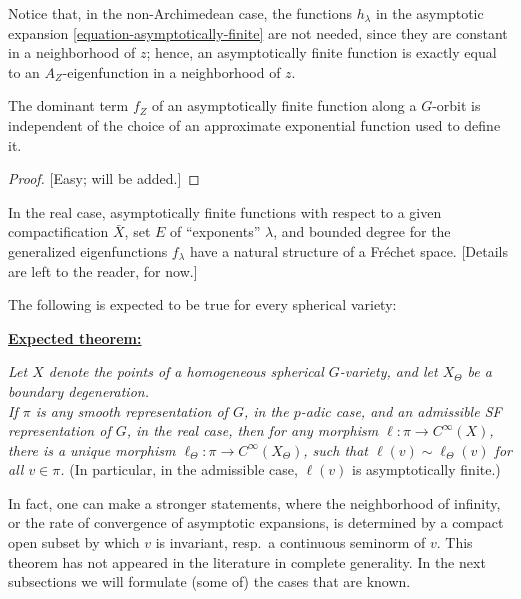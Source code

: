 \begin{remark}
 \label{remark-asymptotically-finite-padic}
Notice that, in the non-Archimedean case, the functions $h_\lambda$ in the asymptotic expansion \eqref{equation-asymptotically-finite} are not needed, since they are constant in a neighborhood of $z$; hence, an asymptotically finite function is exactly equal to an $A_Z$-eigenfunction in a neighborhood of $z$.
\end{remark}



\begin{lemma}
 \label{lemma-dominant-term}
The dominant term $f_Z$ of an asymptotically finite function along a $G$-orbit is independent of the choice of an approximate exponential function used to define it.
\end{lemma}

\begin{proof}

[Easy; will be added.]
\end{proof}

In the real case, asymptotically finite functions with respect to a given compactification $\bar X$, set $E$ of ``exponents'' $\lambda$, and bounded degree for the generalized eigenfunctions $f_\lambda$ have a natural structure of a Fr\'echet space. [Details are left to the reader, for now.]



\begin{remark}
\label{remark-expectedtheorem-asymptotics} 
The following is expected to be true for every spherical variety:

\underline{\textbf{Expected theorem:}}

\emph{
Let $X$ denote the points of a homogeneous spherical $G$-variety, and let $X_\Theta$ be a boundary degeneration.\\
  If $\pi$ is any smooth representation of $G$, in the $p$-adic case, and an admissible SF representation of $G$, in the real case, then for any morphism $\ell: \pi\to C^\infty(X)$, there is a unique morphism $\ell_\Theta: \pi\to C^\infty(X_\Theta)$, such that 
  $\ell(v) \sim \ell_\Theta(v)$ for all $v\in \pi$.} (In particular, in the admissible case, $\ell(v)$ is asymptotically finite.)
  
In fact, one can make a stronger statements, where the neighborhood of infinity, or the rate of convergence of asymptotic expansions, is determined by a compact open subset by which $v$ is invariant, resp.\ a continuous seminorm of $v$. This theorem has not appeared in the literature in complete generality. In the next subsections we will formulate (some of) the cases that are known.
\end{remark}

